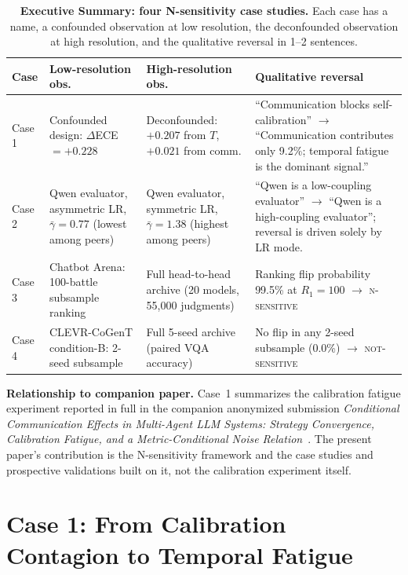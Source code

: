 \documentclass[11pt]{article}
\begin{document}
\begin{table}[t]
\centering
\caption{\textbf{Executive Summary: four N-sensitivity case studies.} Each case has a name, a confounded observation at low resolution, the deconfounded observation at high resolution, and the qualitative reversal in 1--2 sentences.}
\label{tab:exec}
\small
\begin{tabular}{@{}p{2.0cm}p{2.8cm}p{4.6cm}p{4.6cm}@{}}
\toprule
\textbf{Case} & \textbf{Low-resolution obs.} & \textbf{High-resolution obs.} & \textbf{Qualitative reversal} \\
\midrule
Case 1
  & Confounded design: $\Delta$ECE $= +0.228$
  & Deconfounded: $+0.207$ from $T$, $+0.021$ from comm.
  & ``Communication blocks self-calibration'' $\to$ ``Communication contributes only 9.2\%; temporal fatigue is the dominant signal.'' \\
Case 2
  & Qwen evaluator, asymmetric LR, $\bar{\gamma} = 0.77$ (lowest among peers)
  & Qwen evaluator, symmetric LR, $\bar{\gamma} = 1.38$ (highest among peers)
  & ``Qwen is a low-coupling evaluator'' $\to$ ``Qwen is a high-coupling evaluator''; reversal is driven solely by LR mode. \\
Case 3
  & Chatbot Arena: 100-battle subsample ranking
  & Full head-to-head archive (20 models, 55{,}000 judgments)
  & Ranking flip probability 99.5\% at $R_1{=}100$ $\to$ \textsc{n-sensitive} \\
Case 4
  & CLEVR-CoGenT condition-B: 2-seed subsample
  & Full 5-seed archive (paired VQA accuracy)
  & No flip in any 2-seed subsample (0.0\%) $\to$ \textsc{not-sensitive} \\
\bottomrule
\end{tabular}
\end{table}

\textbf{Relationship to companion paper.} Case~1 summarizes the calibration fatigue experiment reported in full in the companion anonymized submission \emph{Conditional Communication Effects in Multi-Agent LLM Systems: Strategy Convergence, Calibration Fatigue, and a Metric-Conditional Noise Relation}~\cite{liu2026calibrationcontagion}. The present paper's contribution is the N-sensitivity framework and the case studies and prospective validations built on it, not the calibration experiment itself.

\section{Case 1: From Calibration Contagion to Temporal Fatigue}
\label{sec:case1}
\end{document}
